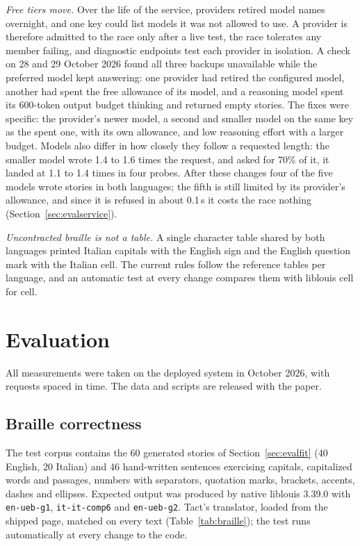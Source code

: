 \documentclass[conference]{IEEEtran}
\begin{document}
\emph{Free tiers move.} Over the life of the service, providers retired model names overnight, and one key could list models it was not allowed to use. A provider is therefore admitted to the race only after a live test, the race tolerates any member failing, and diagnostic endpoints test each provider in isolation. A check on 28 and 29 October 2026 found all three backups unavailable while the preferred model kept answering: one provider had retired the configured model, another had spent the free allowance of its model, and a reasoning model spent its 600-token output budget thinking and returned empty stories. The fixes were specific: the provider's newer model, a second and smaller model on the same key as the spent one, with its own allowance, and low reasoning effort with a larger budget. Models also differ in how closely they follow a requested length: the smaller model wrote 1.4 to 1.6 times the request, and asked for 70\% of it, it landed at 1.1 to 1.4 times in four probes. After these changes four of the five models wrote stories in both languages; the fifth is still limited by its provider's allowance, and since it is refused in about 0.1\,s it costs the race nothing (Section~\ref{sec:evalservice}).

\emph{Uncontracted braille is not a table.} A single character table shared by both languages printed Italian capitals with the English sign and the English question mark with the Italian cell. The current rules follow the reference tables per language, and an automatic test at every change compares them with liblouis cell for cell.

\section{Evaluation}\label{sec:eval}

All measurements were taken on the deployed system in October 2026, with requests spaced in time. The data and scripts are released with the paper.

\subsection{Braille correctness}\label{sec:evalbraille}

The test corpus contains the 60 generated stories of Section~\ref{sec:evalfit} (40 English, 20 Italian) and 46 hand-written sentences exercising capitals, capitalized words and passages, numbers with separators, quotation marks, brackets, accents, dashes and ellipses. Expected output was produced by native liblouis 3.39.0 with \texttt{en-ueb-g1}, \texttt{it-it-comp6} and \texttt{en-ueb-g2}. Tact's translator, loaded from the shipped page, matched on every text (Table~\ref{tab:braille}); the test runs automatically at every change to the code.
\end{document}
